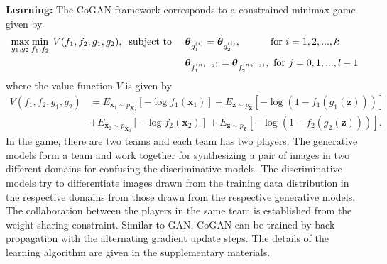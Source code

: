 \documentclass{article}
\begin{document}
{\bf Learning: }
The CoGAN framework corresponds to a constrained minimax game given by
\begin{align}
 \max_{g_1,g_2} \min_{f_1,f_2} \medspace V(f_1,f_2,g_1,g_2), \medspace \text{ subject to }\quad 
&\text{\boldmath$\theta$}_{g_1^{(i)}}=\text{\boldmath$\theta$}_{g_2^{(i)}}, \quad\quad\quad\text{for $i=1,2,...,k$} \quad \\
&\text{\boldmath$\theta$}_{f_1^{(n_1-j)}}=\text{\boldmath$\theta$}_{f_2^{(n_2-j)}}, \space\space\text{ for $j=0,1,...,l-1$} \nonumber
\end{align}
where the value function $V$ is given by 
\begin{align}
V(f_1,f_2,g_1,g_2) &= E_{ \mathbf{x}_1 \sim p_{\mathbf{X}_1}} [ - \log f_1(\mathbf{x}_1) ] + E_{\mathbf{z}\sim p_{\mathbf{Z}}} [ - \log( 1 - f_1(g_1(\mathbf{z}))) ]\nonumber\\
& + E_{ \mathbf{x}_2 \sim p_{\mathbf{X}_2}} [ - \log f_2(\mathbf{x}_2) ]+ E_{\mathbf{z}\sim p_{\mathbf{Z}}} [ - \log( 1 - f_2(g_2(\mathbf{z}))) ].
\end{align}
In the game, there are two teams and each team has two players. The generative models form a team and work together for synthesizing a pair of images in two different domains for confusing the discriminative models. The discriminative models try to differentiate images drawn from the training data distribution in the respective domains from those drawn from the respective generative models. The collaboration between the players in the same team is established from the weight-sharing constraint. Similar to GAN, CoGAN can be trained by back propagation with the alternating gradient update steps. The details of the learning algorithm are given in the supplementary materials.
\end{document}
